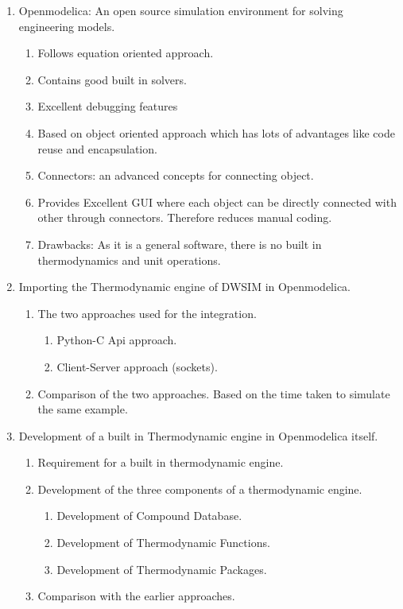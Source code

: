 \documentclass[12pt]{article}
\begin{document}
\begin{enumerate}
\item Openmodelica: An open source simulation environment for solving engineering models.
\begin{enumerate}[label*=\arabic*.]
 \item Follows equation oriented approach.
 \item Contains good built in solvers.
 \item Excellent debugging features
 \item Based on object oriented approach which has lots of advantages like code reuse and encapsulation.
 \item Connectors: an advanced concepts for connecting object.
 \item Provides Excellent GUI where each object can be directly connected with other through connectors. Therefore reduces manual coding.
 \item Drawbacks: As it is a general software, there is no built in thermodynamics and unit operations. 
 \end{enumerate}

\item Importing the Thermodynamic engine of DWSIM in Openmodelica. 
\begin{enumerate}[label*=\arabic*.]
\item The two approaches used for the integration.
\begin{enumerate}[label*=\arabic*.]
\item Python-C Api approach.
\item Client-Server approach (sockets). 
\end{enumerate}
\item Comparison of the two approaches. Based on the time taken to simulate the same example.
\end{enumerate}

\item Development of a built in Thermodynamic engine in Openmodelica itself.
\begin{enumerate}[label*=\arabic*.]
\item Requirement for a built in thermodynamic engine.
\item Development of the three components of a thermodynamic engine.
\begin{enumerate}[label*=\arabic*.]
\item Development of Compound Database.
\item Development of Thermodynamic Functions.
\item Development of Thermodynamic Packages.
\end{enumerate}
\item Comparison with the earlier approaches.
\end{enumerate}


\end{enumerate}
\end{document}
